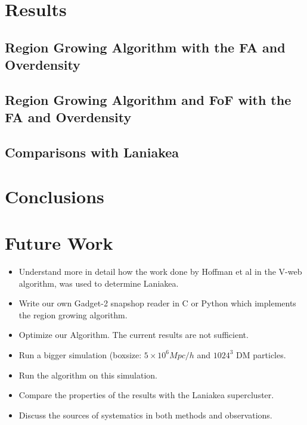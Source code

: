 \documentclass[12pt]{article}
\begin{document}
\section{Results}


\subsection{Region Growing Algorithm with the FA and Overdensity}

\subsection{Region Growing Algorithm and FoF with the FA and Overdensity}



\subsection{Comparisons with Laniakea}

\section{Conclusions}

\section{Future Work}
\begin{itemize}
	\item Understand more in detail how the work done by Hoffman et al\cite{hoffman_kinematic_2012} in the V-web algorithm, was used to determine Laniakea.
    \item Write our own Gadget-2 snapshop reader in C or Python which implements the region growing algorithm.
    \item Optimize our Algorithm. The current results are not sufficient.
    \item Run a bigger simulation (boxsize: $5 \times 10^{6} Mpc/h$ and $1024^3$ DM particles.
    \item Run the algorithm on this simulation.
    \item Compare the properties of the results with the Laniakea supercluster.
    \item Discuss the sources of systematics in both methods and observations.
\end{itemize}
\end{document}
